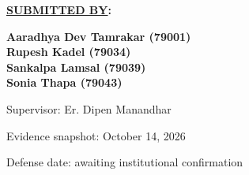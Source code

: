 \begin{titlepage}
\setlength{\parskip}{0pt}
\renewcommand{\SubmittedBy}[1]{\par\vspace{6mm}\textbf{\underline{SUBMITTED BY}:}\par #1\vspace{3mm}}
\begin{center}
\UniversityTitleBlock
{}
\par\vspace{4mm}\textbf{\ReportStage}
\SubmittedBy{\begin{center}\bfseries
Aaradhya Dev Tamrakar (79001) \\[2mm]
Rupesh Kadel (79034) \\[2mm]
Sankalpa Lamsal (79039) \\[2mm]
Sonia Thapa (79043)
\end{center}}
Supervisor: Er. Dipen Manandhar\par
\vspace{4mm}Evidence snapshot: October 14, 2026\par
Defense date: awaiting institutional confirmation
\end{center}
\end{titlepage}
